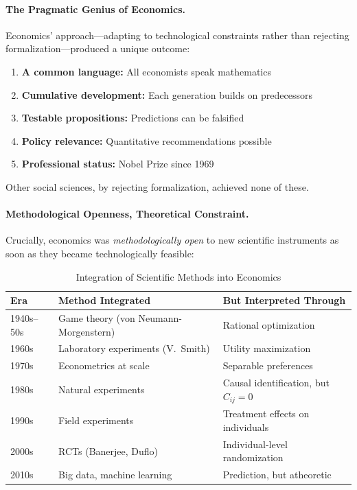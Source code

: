 \paragraph{The Pragmatic Genius of Economics.}

Economics' approach---adapting to technological constraints rather than
rejecting formalization---produced a unique outcome:

\begin{enumerate}[nosep]
    \item \textbf{A common language:} All economists speak mathematics
    \item \textbf{Cumulative development:} Each generation builds on predecessors
    \item \textbf{Testable propositions:} Predictions can be falsified
    \item \textbf{Policy relevance:} Quantitative recommendations possible
    \item \textbf{Professional status:} Nobel Prize since 1969
\end{enumerate}

Other social sciences, by rejecting formalization, achieved none of these.

\paragraph{Methodological Openness, Theoretical Constraint.}

Crucially, economics was \textit{methodologically open} to new scientific instruments
as soon as they became technologically feasible:

\begin{table}[htbp]
\centering
\caption{Integration of Scientific Methods into Economics}
\label{tab:method-integration}
\renewcommand{\arraystretch}{1.3}
\small
\begin{tabular}{@{}llp{5cm}@{}}
\toprule
\textbf{Era} & \textbf{Method Integrated} & \textbf{But Interpreted Through} \\
\midrule
1940s--50s & Game theory (von Neumann-Morgenstern) & Rational optimization \\
1960s & Laboratory experiments (V.\ Smith) & Utility maximization \\
1970s & Econometrics at scale & Separable preferences \\
1980s & Natural experiments & Causal identification, but $C_{ij} = 0$ \\
1990s & Field experiments & Treatment effects on individuals \\
2000s & RCTs (Banerjee, Duflo) & Individual-level randomization \\
2010s & Big data, machine learning & Prediction, but atheoretic \\
\bottomrule
\end{tabular}
\end{table}

